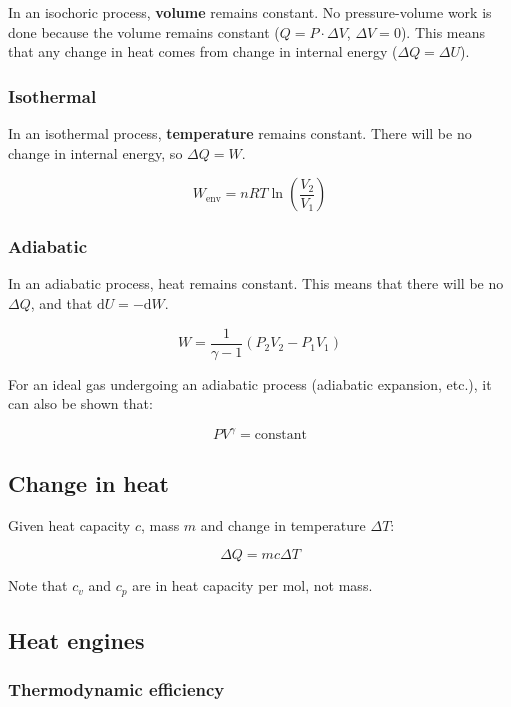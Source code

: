 \documentclass[12pt]{article}
\begin{document}
In an isochoric process, \textbf{volume} remains constant. No pressure-volume work is done because the volume remains constant ($Q = P\cdot\Delta V$, $\Delta V = 0$). This means that any change in heat comes from change in internal energy ($\Delta Q = \Delta U$).

\subsubsection{Isothermal}

In an isothermal process, \textbf{temperature} remains constant. There will be no change in internal energy, so $\Delta Q = W$.

\[
\boxed{
W_{\text{env}} = nRT\ln\left(\frac{V_2}{V_1}\right)
}
\]

\subsubsection{Adiabatic}

In an adiabatic process, heat remains constant. This means that there will be no $\Delta Q$, and that $\mathrm{d}U = -\mathrm{d}W$.

\[
\boxed{
W = \frac{1}{\gamma - 1}(P_2 V_2 - P_1 V_1)
}
\]


For an ideal gas undergoing an adiabatic process (adiabatic expansion, etc.), it can also be shown that:

\[
\boxed{
PV^\gamma = \text{constant}
}
\]

\subsection{Change in heat}

Given heat capacity $c$, mass $m$ and change in temperature $\Delta T$:

\[
\boxed{
\Delta Q = mc\Delta T
}
\]

Note that $c_v$ and $c_p$ are in heat capacity per mol, not mass.

\newpage

\subsection{Heat engines}

\subsubsection{Thermodynamic efficiency}
\end{document}
